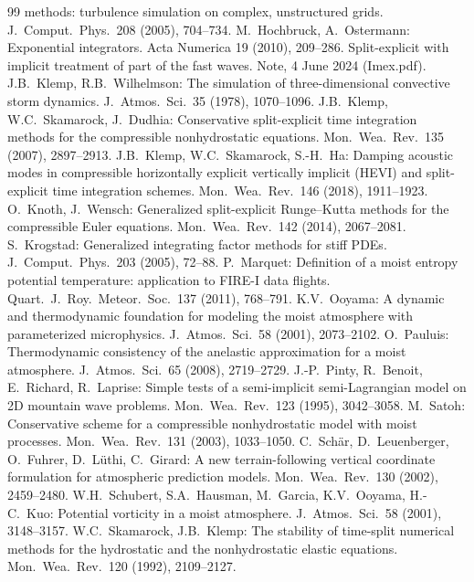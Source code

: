 \documentclass[11pt,a4paper]{article}
\begin{document}
\begin{thebibliography}{99}
methods: turbulence simulation on complex, unstructured grids. J.\ Comput.\ Phys.\ 208 (2005), 704--734.
 M.~Hochbruck, A.~Ostermann: Exponential integrators. Acta Numerica 19 (2010), 209--286.
 Split-explicit with implicit treatment of part of the fast waves. Note, 4 June 2024 (Imex.pdf).
 J.B.~Klemp, R.B.~Wilhelmson: The simulation of three-dimensional convective storm
dynamics. J.\ Atmos.\ Sci.\ 35 (1978), 1070--1096.
 J.B.~Klemp, W.C.~Skamarock, J.~Dudhia: Conservative split-explicit time integration methods
for the compressible nonhydrostatic equations. Mon.\ Wea.\ Rev.\ 135 (2007), 2897--2913.
 J.B.~Klemp, W.C.~Skamarock, S.-H.~Ha: Damping acoustic modes in compressible horizontally
explicit vertically implicit (HEVI) and split-explicit time integration schemes. Mon.\ Wea.\ Rev.\ 146
(2018), 1911--1923.
 O.~Knoth, J.~Wensch: Generalized split-explicit Runge--Kutta methods for the
compressible Euler equations. Mon.\ Wea.\ Rev.\ 142 (2014), 2067--2081.
 S.~Krogstad: Generalized integrating factor methods for stiff PDEs. J.\ Comput.\ Phys.\
203 (2005), 72--88.
 P.~Marquet: Definition of a moist entropy potential temperature: application to FIRE-I data
flights. Quart.\ J.\ Roy.\ Meteor.\ Soc.\ 137 (2011), 768--791.
 K.V.~Ooyama: A dynamic and thermodynamic foundation for modeling the moist atmosphere with
parameterized microphysics. J.\ Atmos.\ Sci.\ 58 (2001), 2073--2102.
\bibitem{pauluis} O.~Pauluis: Thermodynamic consistency of the anelastic approximation for a moist atmosphere.
J.\ Atmos.\ Sci.\ 65 (2008), 2719--2729.
 J.-P.~Pinty, R.~Benoit, E.~Richard, R.~Laprise: Simple tests of a semi-implicit semi-Lagrangian
model on 2D mountain wave problems. Mon.\ Wea.\ Rev.\ 123 (1995), 3042--3058.
\bibitem{satoh} M.~Satoh: Conservative scheme for a compressible nonhydrostatic model with moist processes.
Mon.\ Wea.\ Rev.\ 131 (2003), 1033--1050.
 C.~Schär, D.~Leuenberger, O.~Fuhrer, D.~Lüthi, C.~Girard: A new terrain-following vertical
coordinate formulation for atmospheric prediction models. Mon.\ Wea.\ Rev.\ 130 (2002), 2459--2480.
\bibitem{schubert} W.H.~Schubert, S.A.~Hausman, M.~Garcia, K.V.~Ooyama, H.-C.~Kuo: Potential vorticity in a moist
atmosphere. J.\ Atmos.\ Sci.\ 58 (2001), 3148--3157.
 W.C.~Skamarock, J.B.~Klemp: The stability of time-split numerical methods for the
hydrostatic and the nonhydrostatic elastic equations. Mon.\ Wea.\ Rev.\ 120 (1992), 2109--2127.

\end{thebibliography}
\end{document}
